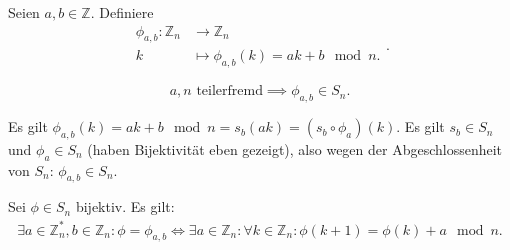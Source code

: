 \documentclass[a4paper]{article}
\newcommand{\Z}{\mathbb{Z}}
\begin{document}
    \begin{definition}
        Seien $a, b \in \Z.$ Definiere 
        \[
        \begin{align*}
            \phi_{a,b}: \Z_n &\longrightarrow \Z_n \\
            k &\longmapsto \phi_{a,b}(k) = ak + b \mod n
        .\end{align*}
        .\] 
    \end{definition}

    \begin{lemma}\label{phi_bij}
        \[
            a, n \text{ teilerfremd} \implies \phi_{a, b} \in S_n
        .\] 
    \end{lemma}
    \begin{beweis}
       Es gilt  $\phi_{a, b}(k) = ak + b \mod n = s_b(ak) = (s_b \circ \phi_a)(k) $. Es gilt $s_b \in S_n$ und $\phi_a \in S_n$ (haben Bijektivität eben gezeigt), also wegen der Abgeschlossenheit von $S_n$:  $\phi_{a, b} \in S_n$. \\ 
    \end{beweis}

    \begin{lemma} \label{phiab-equiv}
        Sei $\phi \in S_n$ bijektiv. Es gilt:
        \begin{align*}
            \exists a \in \Z_n^{*}, b \in \Z_n : \phi = \phi_{a, b}
            \iff \exists a \in \Z_n: \forall k \in \Z_n: \phi(k+1) = \phi(k)+a \mod n
        .\end{align*}
    \end{lemma}
\end{document}
